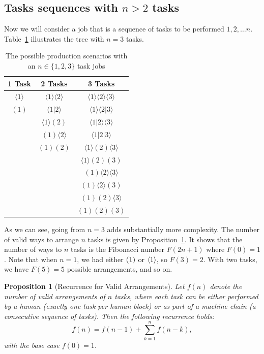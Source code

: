 \documentclass{article}
\theoremstyle{plain}
\theoremstyle{plain}
\newtheorem{proposition}[theorem]{Proposition}
\begin{document}
\subsection{Tasks sequences with $n > 2$ tasks}
Now we will consider a job that is a sequence of tasks to be performed $1, 2, \ldots n$.
Table~\ref{tab:tree} illustrates the tree with $n=3$ tasks.

\begin{table}
  \centering
  \caption{The possible production scenarios with an $n \in \{1,2,3\}$ task jobs}
  \label{tab:tree}
  \begin{tabular}{ccc}
  \hline
  1 Task & 2 Tasks & 3 Tasks \\
  \hline
  $\langle 1 \rangle$ & $\langle 1 \rangle \langle 2 \rangle$ & $\langle 1 \rangle \langle 2 \rangle \langle 3 \rangle$ \\
  $(1)$ & $\langle 1|2 \rangle$ & $\langle 1 \rangle \langle 2|3 \rangle$ \\
  & $\langle 1 \rangle (2)$ & $\langle 1|2 \rangle \langle 3 \rangle$ \\
  & $(1) \langle 2 \rangle$ & $\langle 1|2|3 \rangle$ \\
  & $(1) (2)$ & $\langle 1 \rangle (2) \langle 3 \rangle$ \\
  & & $\langle 1 \rangle (2) (3)$ \\
  & & $(1) \langle 2 \rangle \langle 3 \rangle$ \\
  & & $(1) \langle 2 \rangle (3)$ \\
  & & $(1) (2) \langle 3 \rangle$ \\
  & & $(1) (2) (3)$ \\
  \hline
  \end{tabular}
  \end{table}

As we can see, going from $n=3$ adds substantially more complexity.
The number of valid ways to arrange $n$ tasks is given by Proposition~\ref{proposition:num_arrangements}.
It shows that the number of ways to $n$ tasks is the Fibonacci number $F(2n+1)$ where $F(0) = 1$.
Note that when $n=1$, we had either $( 1 )$ or $\langle 1 \rangle$, so $F(3) = 2$.
With two tasks, we have $F(5) = 5$ possible arrangements, and so on. 

\begin{proposition}[Recurrence for Valid Arrangements] \label{proposition:num_arrangements}
  Let $f(n)$ denote the number of valid arrangements of $n$ tasks, where each task can be either performed by a human (exactly one task per human block) or as part of a machine chain (a consecutive sequence of tasks). Then the following recurrence holds:
  \[
  f(n) = f(n-1) + \sum_{k=1}^{n} f(n-k),
  \]
  with the base case $f(0) = 1$.
  \end{proposition}
  
\end{document}
